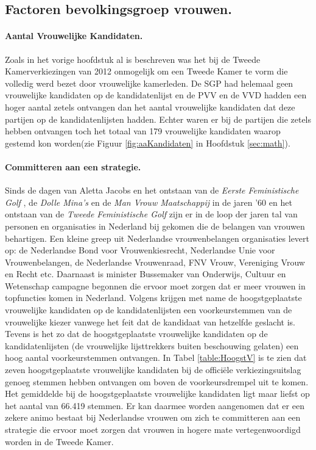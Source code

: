 \paragraaf{}


\subsection{Factoren bevolkingsgroep vrouwen.}
\label{percV}

\paragraph{Aantal Vrouwelijke Kandidaten.}
Zoals in het vorige hoofdstuk al is beschreven was het bij de Tweede Kamerverkiezingen van 2012 onmogelijk om een Tweede Kamer te vorm die volledig werd bezet door vrouwelijke kamerleden. De SGP had helemaal geen vrouwelijke kandidaten op de kandidatenlijst en de PVV en de VVD hadden een hoger aantal zetels ontvangen dan het aantal vrouwelijke kandidaten dat deze partijen op de kandidatenlijsten hadden. Echter waren er bij de partijen die zetels hebben ontvangen toch het totaal van 179 vrouwelijke kandidaten waarop gestemd kon worden(zie Figuur \ref{fig:aaKandidaten} in Hoofdstuk  \ref{sec:math}). 

\paragraph{Committeren aan een strategie.}
Sinds de dagen van Aletta Jacobs en het ontstaan van de \textit{Eerste Feministische Golf} \citep{braun1992prijs}, de \textit{Dolle Mina's} en de \textit{Man Vrouw Maatschappij} in de jaren '60 en het ontstaan van de \textit{Tweede Feministische Golf} \citep{van2005vrouw} zijn er in de loop der jaren tal van personen en organisaties in Nederland bij gekomen die de belangen van vrouwen behartigen. Een kleine greep uit Nederlandse vrouwenbelangen organisaties levert op: de Nederlandse Bond voor Vrouwenkiesrecht, Nederlandse Unie voor Vrouwenbelangen, de Nederlandse Vrouwenraad, FNV Vrouw, Vereniging Vrouw en Recht etc. Daarnaast is minister Bussemaker van Onderwijs, Cultuur en Wetenschap \citeyearpar{navigerennaardetop} campagne begonnen die ervoor moet zorgen dat er meer vrouwen in topfuncties komen in Nederland. Volgens \cite{van2012tweede} krijgen met name de hoogstgeplaatste vrouwelijke kandidaten op de kandidatenlijsten een voorkeurstemmen van de vrouwelijke kiezer vanwege het feit dat de kandidaat van hetzelfde geslacht is. Tevens is het zo dat de hoogstgeplaatste vrouwelijke kandidaten op de kandidatenlijsten (de vrouwelijke lijsttrekkers buiten beschouwing gelaten) een hoog aantal voorkeurstemmen ontvangen. In Tabel \ref{table:HoogstV} is te zien dat zeven hoogstgeplaatste vrouwelijke kandidaten bij de offici\"{e}le verkiezingsuitslag genoeg stemmen hebben ontvangen om boven de voorkeursdrempel uit te komen. Het gemiddelde bij de hoogstgeplaatste vrouwelijke kandidaten ligt maar liefst op het aantal van 66.419 stemmen. Er kan daarmee worden aangenomen dat er een zekere animo bestaat bij Nederlandse vrouwen om zich te committeren aan een strategie die ervoor moet zorgen dat vrouwen in hogere mate vertegenwoordigd worden in de Tweede Kamer. 


